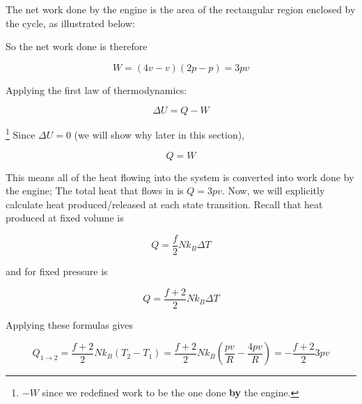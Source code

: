 The net work done by the engine is the area of the rectangular region enclosed by the cycle, as illustrated below:

\begin{center}
\end{center}

So the net work done is therefore

\[W=(4v-v)(2p-p)=3pv\]

Applying the first law of thermodynamics:

\[\Delta U=Q-W\]

\footnote{$-W$ since we redefined work to be the one done \textbf{by} the engine.} Since $\Delta U=0$ (we will show why later in this section),

\[Q=W\]

This means all of the heat flowing into the system is converted into work done by the engine; The total heat that flows in is $Q=3pv$. Now, we will explicitly calculate heat produced/released at each state transition. Recall that heat produced at fixed volume is

\[Q=\frac{f}{2} Nk_B\Delta T\]

and for fixed pressure is

\[Q=\frac{f+2}{2} Nk_B\Delta T\]

Applying these formulas gives

\[Q_{1\to2}=\frac{f+2}{2} Nk_B(T_2-T_1)=\frac{f+2}{2} Nk_B\left(\frac{pv}{R}-\frac{4pv}{R}\right)=-\frac{f+2}{2} 3pv\]

